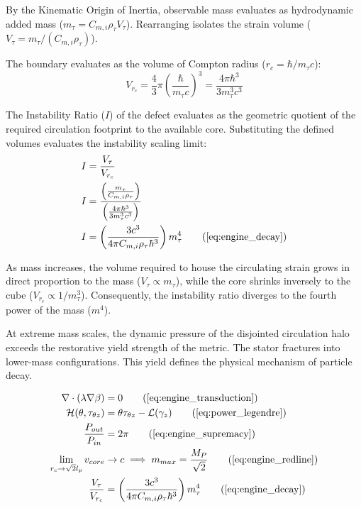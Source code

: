 By the Kinematic Origin of Inertia, observable mass evaluates as hydrodynamic added mass ($m_\tau = C_{m,i} \rho_{\tau} V_\tau$). Rearranging isolates the strain volume ($V_\tau = m_\tau / (C_{m,i} \rho_{\tau})$). 

The boundary evaluates as the volume of Compton radius ($r_c = \hbar / m_\tau c$):
\begin{equation}
    V_{r_c} = \frac{4}{3}\pi \left(\frac{\hbar}{m_\tau c}\right)^3 = \frac{4\pi\hbar^3}{3m_\tau^3 c^3} 
\end{equation}

The Instability Ratio ($I$) of the defect evaluates as the geometric quotient of the required circulation footprint to the available core. Substituting the defined volumes evaluates the instability scaling limit:
\begin{align}
    I &= \frac{V_\tau}{V_{r_c}} \nonumber \\
    I &= \frac{\left(\frac{m_\tau}{C_{m,i} \rho_{\tau}}\right)}{\left(\frac{4\pi\hbar^3}{3m_\tau^3 c^3}\right)} \nonumber \\ 
    I &= \left(\frac{3c^3}{4\pi C_{m,i} \rho_{\tau}\hbar^3}\right) m_\tau^4 \tag{\ref{eq:engine_decay}} 
\end{align}

As mass increases, the volume required to house the circulating strain grows in direct proportion to the mass ($V_\tau \propto m_\tau$), while the core shrinks inversely to the cube ($V_{r_c} \propto 1/m_\tau^3$). Consequently, the instability ratio diverges to the fourth power of the mass ($m^4$). 

At extreme mass scales, the dynamic pressure of the disjointed circulation halo exceeds the restorative yield strength of the metric. The stator fractures into lower-mass configurations. This yield defines the physical mechanism of particle decay. 

\begin{tcolorbox}[recallbox, title={\ref{box:unified_engine}. The Unified Topological Engine}]
\begin{align}
    \nabla \cdot (\lambda \nabla \beta) &= 0 \tag{\ref{eq:engine_transduction}} \\
    \mathcal{H}(\theta, \tau_{\theta z}) &= \theta \tau_{\theta z} - \mathcal{L}(\gamma_z) \tag{\ref{eq:power_legendre}} \\
    \frac{P_{out}}{P_{in}} &= 2\pi \tag{\ref{eq:engine_supremacy}} \\
    \lim_{r_c \to \sqrt{2} l_p} v_{core} &\to c \implies m_{max} = \frac{M_P}{\sqrt{2}} \tag{\ref{eq:engine_redline}} \\ %
    \frac{V_\tau}{V_{r_c}} &= \left(\frac{3c^3}{4\pi C_{m,i} \rho_{\tau}\hbar^3}\right) m_\tau^4 \tag{\ref{eq:engine_decay}} 
\end{align}
\end{tcolorbox}


